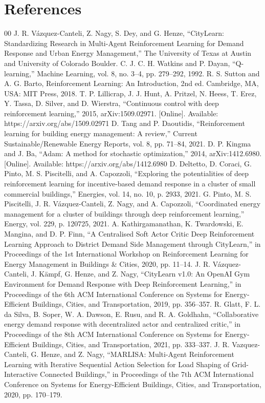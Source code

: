 \documentclass[conference]{IEEEtran}
\begin{document}
\section*{References}

\begin{thebibliography}{00}
 J. R. Vázquez-Canteli, Z. Nagy, S. Dey, and G. Henze, 
``CityLearn: Standardizing Research in Multi-Agent Reinforcement Learning for Demand Response and Urban Energy Management,'' 
The University of Texas at Austin and University of Colorado Boulder.
 C. J. C. H. Watkins and P. Dayan, ``Q-learning,'' Machine Learning, vol. 8, no. 3--4, pp. 279--292, 1992.
 R. S. Sutton and A. G. Barto, Reinforcement Learning: An Introduction, 2nd ed. Cambridge, MA, USA: MIT Press, 2018.
 T. P. Lillicrap, J. J. Hunt, A. Pritzel, N. Heess, T. Erez, Y. Tassa, D. Silver, and D. Wierstra, ``Continuous control with deep reinforcement learning,'' 2015, arXiv:1509.02971. [Online]. Available: https://arxiv.org/abs/1509.02971
 D. Tang and P. Daoutidis, ``Reinforcement learning for building energy management: A review,'' Current Sustainable/Renewable Energy Reports, vol. 8, pp. 71--84, 2021.
 D. P. Kingma and J. Ba, ``Adam: A method for stochastic optimization,'' 2014, arXiv:1412.6980. [Online]. Available: https://arxiv.org/abs/1412.6980
 D. Deltetto, D. Coraci, G. Pinto, M. S. Piscitelli, and A. Capozzoli, ``Exploring the potentialities of deep reinforcement learning for incentive-based demand response in a cluster of small commercial buildings,'' Energies, vol. 14, no. 10, p. 2933, 2021.
 G. Pinto, M. S. Piscitelli, J. R. V\'{a}zquez-Canteli, Z. Nagy, and A. Capozzoli, ``Coordinated energy management for a cluster of buildings through deep reinforcement learning,'' Energy, vol. 229, p. 120725, 2021.
 A. Kathirgamanathan, K. Twardowski, E. Mangina, and D. P. Finn, ``A Centralised Soft Actor Critic Deep Reinforcement Learning Approach to District Demand Side Management through CityLearn,'' in Proceedings of the 1st International Workshop on Reinforcement Learning for Energy Management in Buildings \& Cities, 2020, pp. 11--14.
 J. R. V\'{a}zquez-Canteli, J. K\"{a}mpf, G. Henze, and Z. Nagy, ``CityLearn v1.0: An OpenAI Gym Environment for Demand Response with Deep Reinforcement Learning,'' in Proceedings of the 6th ACM International Conference on Systems for Energy-Efficient Buildings, Cities, and Transportation, 2019, pp. 356--357.
 R. Glatt, F. L. da Silva, B. Soper, W. A. Dawson, E. Rusu, and R. A. Goldhahn, ``Collaborative energy demand response with decentralized actor and centralized critic,'' in Proceedings of the 8th ACM International Conference on Systems for Energy-Efficient Buildings, Cities, and Transportation, 2021, pp. 333--337.
 J. R. Vazquez-Canteli, G. Henze, and Z. Nagy, ``MARLISA: Multi-Agent Reinforcement Learning with Iterative Sequential Action Selection for Load Shaping of Grid-Interactive Connected Buildings,'' in Proceedings of the 7th ACM International Conference on Systems for Energy-Efficient Buildings, Cities, and Transportation, 2020, pp. 170--179.
\end{thebibliography}
\end{document}
